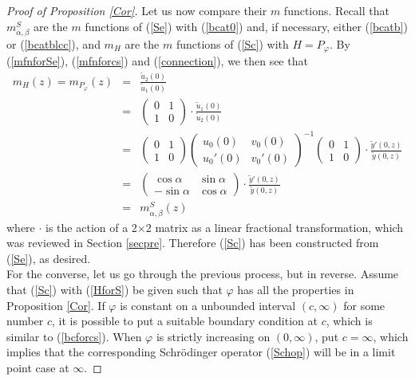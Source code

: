 \documentclass[preprint,12pt]{elsarticle}
\begin{document}
\begin{proof}[Proof of Proposition \ref{Cor}]
Let us now compare their $m$ functions. Recall that $m^S_{\alpha, \beta}$ are the $m$ functions of (\ref{Se}) with (\ref{bcat0}) and, if necessary, either (\ref{bcatb}) or (\ref{bcatblcc}), and $m_H$ are the $m$ functions of (\ref{Sc}) with $H=P_{\varphi}$.  By (\ref{mfnforSe}), (\ref{mfnforcs}) and (\ref{connection}), we then see that  
\begin{eqnarray*}
m_H(z)=m_{P_{\varphi}}(z) &=& \frac{\tilde{u}_2(0)}{\tilde{u}_1(0)}\\
&=& \begin{pmatrix} 0 & 1 \\ 1 & 0 \end{pmatrix} \cdot \frac{\tilde{u}_1(0)}{\tilde{u}_2(0)}\\
&=& \begin{pmatrix} 0 & 1 \\ 1 & 0 \end{pmatrix} 
\begin{pmatrix} u_0(0) & v_0(0) \\ u_0'(0) & v_0'(0) \end{pmatrix}^{-1}
\begin{pmatrix} 0 & 1 \\ 1 & 0 \end{pmatrix} 
\cdot
\frac{\tilde{y}'(0,z)}{\tilde{y}(0,z)}\\
&=&
\begin{pmatrix}  \cos\alpha & \sin\alpha \\ -\sin\alpha & \cos\alpha \end{pmatrix} \cdot
\frac{\tilde{y}'(0,z)}{\tilde{y}(0,z)}\\
&=& m^S_{\alpha, \beta}(z)
\end{eqnarray*} 
where $\cdot$ is the action of a 2$\times$2 matrix as a linear fractional transformation, which was reviewed in Section \ref{secpre}.
Therefore (\ref{Sc}) has been constructed from (\ref{Se}), as desired.\\

For the converse, let us go through the previous process, but in reverse. Assume that (\ref{Sc}) with (\ref{HforS}) be given such that $\varphi$ has all the properties in Proposition \ref{Cor}. If $\varphi$ is constant on a unbounded interval $(c,\infty)$ for some number $c$,  it is possible to put a suitable boundary condition at $c$, which is similar to (\ref{bcforcs}). When $\varphi$ is strictly increasing on $(0,\infty)$, put $c=\infty$, which implies that the corresponding Schr\"odinger operator (\ref{Schop}) will be in a limit point case at $\infty$. 


\end{proof}
\end{document}
